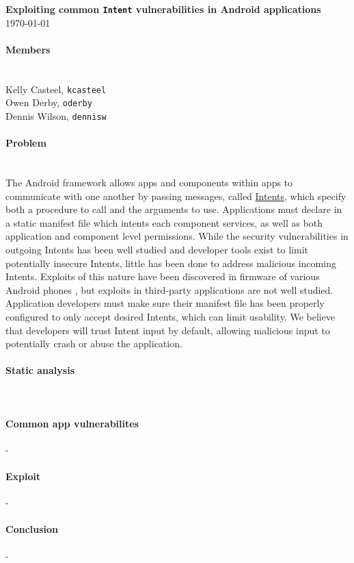 \documentclass[12pt,a4paper]{article} \usepackage{verbatim}
\begin{document}
 

\flushleft\textbf{Exploiting common \texttt{Intent} vulnerabilities in Android %
applications}\\ \today\\

\paragraph{Members} ~\\

Kelly Casteel, \texttt{kcasteel}\\ Owen Derby, \texttt{oderby}\\ Dennis Wilson,
\texttt{dennisw}\\

\paragraph{Problem} ~\\ The Android framework allows apps and components within
apps to communicate with one another by passing messages, called
\href{https://developer.android.com/reference/android/content/Intent.html}{Intents},
which specify both a procedure to call and the arguments to use. Applications
must declare in a static manifest file which intents each component services, as
well as both application and component level permissions. While the security
vulnerabilities in outgoing Intents has been well studied
\cite{chin_analyzing_2011} and developer tools exist to limit potentially
insecure Intents, little has been done to address malicious incoming Intents.
Exploits of this nature have been discovered in firmware of various Android
phones \cite{grace_systematic_2012}, but exploits in third-party applications
are not well studied. Application developers must make sure their manifest file
has been properly configured to only accept desired Intents, which can limit
usability. We believe that developers will trust Intent input by default,
allowing malicious input to potentially crash or abuse the application.

\paragraph{Static analysis} ~\\

\paragraph{Common app vulnerabilites} -\\

\paragraph{Exploit} -\\

\paragraph{Conclusion} -\\

 
\end{document}
